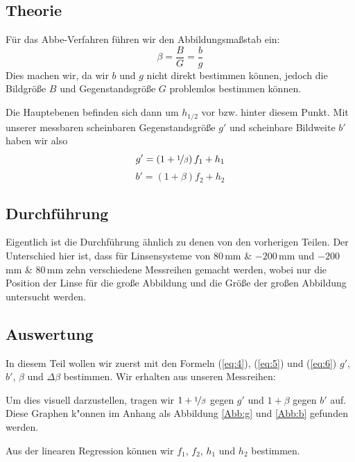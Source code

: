 \documentclass[11pt,a4paper]{article}
\begin{document}
\subsection{Theorie}

F\"ur das Abbe-Verfahren f\"uhren wir den Abbildungsma\ss stab ein:
\begin{equation}
\beta=\frac{B}{G}=\frac{b}{g}\label{eq:4}
\end{equation}
Dies machen wir, da wir $b$ und $g$ nicht direkt bestimmen k\"onnen, jedoch die Bildgr\"o\ss e $B$ und Gegenstandsgr\"o\ss e $G$ problemlos bestimmen k\"onnen.

Die Hauptebenen befinden sich dann um $h_{1/2}$ vor bzw. hinter diesem Punkt. Mit unserer messbaren scheinbaren Gegenstandsgr\"o\ss e $g'$ und scheinbare Bildweite $b'$ haben wir also
\begin{equation}
g'=\left(1+\nicefrac{1}{\beta}\right)f_1+h_1\label{eq:5}
\end{equation}
\begin{equation}
b'=\left(1+\beta\right)f_2+h_2\label{eq:6}
\end{equation}

\subsection{Durchführung}

Eigentlich ist die Durchf\"uhrung \"ahnlich zu denen von den vorherigen Teilen. Der Unterschied hier ist, dass f\"ur Linsensysteme von 80\,mm \& $-200$\,mm und $-200$\,mm \& 80\,mm zehn verschiedene Messreihen gemacht werden, wobei nur die Position der Linse f\"ur die gro\ss e Abbildung und die Gr\"o\ss e der gro\ss en Abbildung untersucht werden.

\pagebreak

\subsection{Auswertung}

In diesem Teil wollen wir zuerst mit den Formeln (\ref{eq:4}), (\ref{eq:5}) und (\ref{eq:6}) $g'$, $b'$, $\beta$ und $\Delta \beta$ bestimmen. Wir erhalten aus unseren Messreihen:

Um dies visuell darzustellen, tragen wir $1+\nicefrac{1}{\beta}$ gegen $g'$ und $1+\beta$ gegen $b'$ auf. Diese Graphen k"onnen im Anhang als Abbildung \ref{Abb:g} und \ref{Abb:b} gefunden werden.

Aus der linearen Regression k\"onnen wir $f_1$, $f_2$, $h_1$ und $h_2$ bestimmen. 
\end{document}
